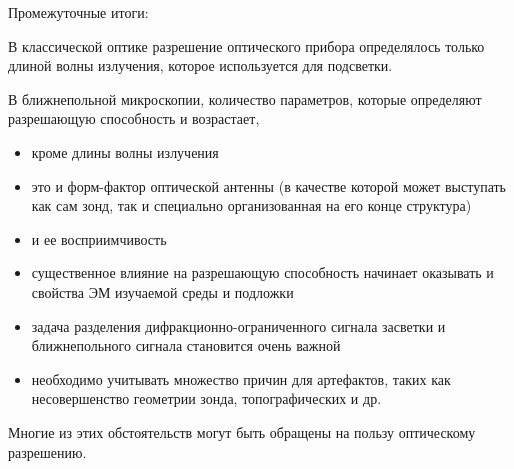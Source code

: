 \documentclass[9pt, compress, xcolor=table]{beamer}
\begin{document}
\begin{frame}{Промежуточные итоги:}

В классической оптике разрешение оптического прибора определялось только длиной волны излучения, которое используется для подсветки.

В ближнепольной микроскопии, количество параметров, которые определяют разрешающую способность и возрастает, 
\begin{itemize}
\item кроме длины волны излучения
\item это и форм-фактор оптической антенны (в качестве которой может выступать как сам зонд, так и специально организованная на его конце структура)
\item и ее восприимчивость
\item существенное влияние на разрешающую способность начинает оказывать и свойства ЭМ изучаемой среды и подложки
\item задача разделения дифракционно-ограниченного сигнала засветки и ближнепольного сигнала становится очень важной
\item необходимо учитывать множество причин для  артефактов, таких как несовершенство геометрии зонда, топографических и др.
\end{itemize}


Многие из этих обстоятельств могут быть обращены на пользу оптическому разрешению.



\end{frame}
\end{document}
